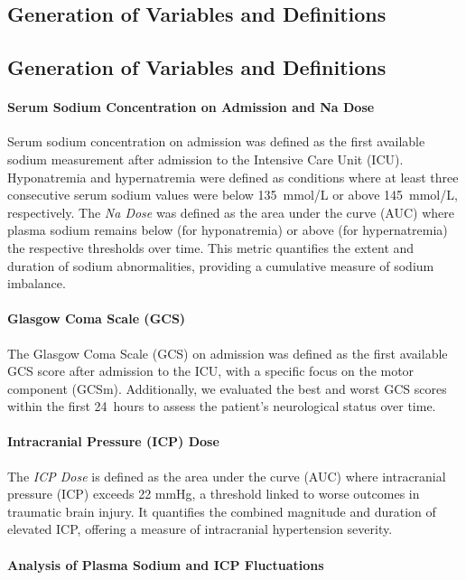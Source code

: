 \subsection{Generation of Variables and Definitions}

\subsection{Generation of Variables and Definitions}

\paragraph{Serum Sodium Concentration on Admission and Na Dose}

Serum sodium concentration on admission was defined as the first available sodium measurement after admission to the Intensive Care Unit (ICU). Hyponatremia and hypernatremia were defined as conditions where at least three consecutive serum sodium values were below 135~mmol/L or above 145~mmol/L, respectively. The \textit{Na Dose} was defined as the area under the curve (AUC) where plasma sodium remains below (for hyponatremia) or above (for hypernatremia) the respective thresholds over time. This metric quantifies the extent and duration of sodium abnormalities, providing a cumulative measure of sodium imbalance.

\paragraph{Glasgow Coma Scale (GCS)}

The Glasgow Coma Scale (GCS) on admission was defined as the first available GCS score after admission to the ICU, with a specific focus on the motor component (GCSm). Additionally, we evaluated the best and worst GCS scores within the first 24~hours to assess the patient's neurological status over time. 

\paragraph{Intracranial Pressure (ICP) Dose}
The \textit{ICP Dose} is defined as the area under the curve (AUC) where intracranial pressure (ICP) exceeds 22 mmHg, a threshold linked to worse outcomes in traumatic brain injury. It quantifies the combined magnitude and duration of elevated ICP, offering a measure of intracranial hypertension severity.


\paragraph{Analysis of Plasma Sodium and ICP Fluctuations}


